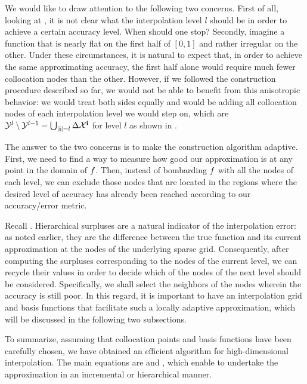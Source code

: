 We would like to draw attention to the following two concerns. First of all,
looking at , it is not clear what the interpolation
level $l$ should be in order to achieve a certain accuracy level. When should
one stop? Secondly, imagine a function that is nearly flat on the first half of
$[0, 1]$ and rather irregular on the other. Under these circumstances, it is
natural to expect that, in order to achieve the same approximating accuracy, the
first half alone would require much fewer collocation nodes than the other.
However, if we followed the construction procedure described so far, we would
not be able to benefit from this anisotropic behavior: we would treat both sides
equally and would be adding all collocation nodes of each interpolation level we
would step on, which are $\mathcal{Y}^l \setminus \mathcal{Y}^{l - 1} = \bigcup_{|\mathbf{i}| = l}
\Delta\mathcal{X}^{\mathbf{i}}$ for level $l$ as shown in .

The answer to the two concerns is to make the construction algorithm adaptive.
First, we need to find a way to measure how good our approximation is at any
point in the domain of $f$. Then, instead of bombarding $f$ with all the nodes
of each level, we can exclude those nodes that are located in the regions where
the desired level of accuracy has already been reached according to our
accuracy/error metric.

Recall . Hierarchical surpluses are a natural indicator
of the interpolation error: as noted earlier, they are the difference between
the true function and its current approximation at the nodes of the underlying
sparse grid. Consequently, after computing the surpluses corresponding to the
nodes of the current level, we can recycle their values in order to decide which
of the nodes of the next level should be considered. Specifically, we shall
select the neighbors of the nodes wherein the accuracy is still poor. In this
regard, it is important to have an interpolation grid and basis functions that
facilitate such a locally adaptive approximation, which will be discussed in the
following two subsections.

To summarize, assuming that collocation points and basis functions have been
carefully chosen, we have obtained an efficient algorithm for high-dimensional
interpolation. The main equations are  and
, which enable to undertake the approximation in an
incremental or hierarchical manner.
